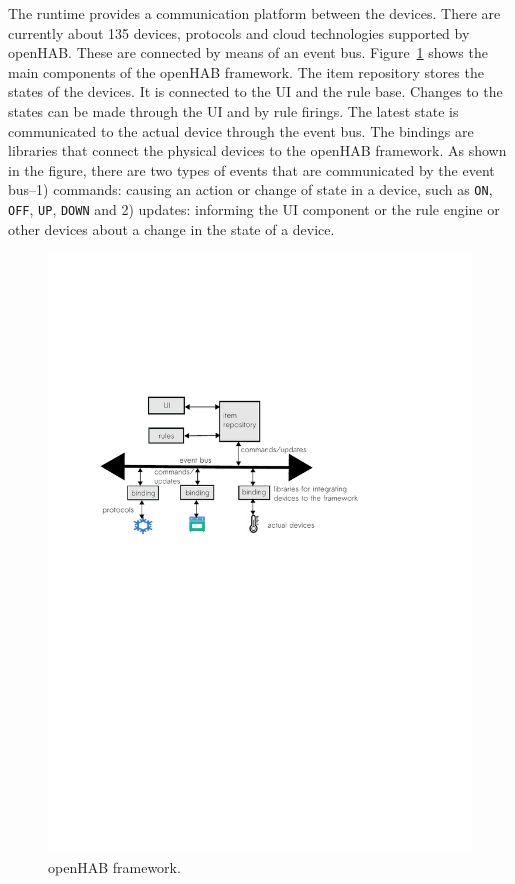 \documentclass{sig-alternate-05-2015}
\begin{document}
The runtime provides a communication platform between the devices. There are currently about 135 devices, protocols and cloud technologies supported by openHAB. These are connected by means of an event bus. Figure~\ref{fig:framework} shows the main components of the openHAB framework. The item repository stores the states of the devices. It is connected to the UI and the rule base. Changes to the states can be made through the UI and by rule firings. The latest state is communicated to the actual device through the event bus. The bindings are libraries that connect the physical devices to the openHAB framework. As shown in the figure, there are two types of events that are communicated by the event bus--1) commands: causing an action or change of state in a device, such as \texttt{ON}, \texttt{OFF}, \texttt{UP}, \texttt{DOWN} and 2) updates: informing the UI component or the rule engine or other devices about a change in the state of a device.
\begin{figure}
\centering
\includegraphics [trim=-2cm 15cm 0 6.5cm, scale=0.4]{images/framework.pdf}
\caption{openHAB framework.}
\label{fig:framework}
\end{figure} 
\end{document}
